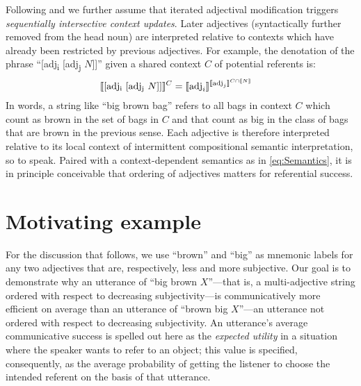 \documentclass[10pt,a4paper]{article}
\newcommand{\den}[1]{\ensuremath{[\![#1]\!]}}
\begin{document}
Following  and  we further assume that iterated adjectival modification triggers \emph{sequentially intersective context updates}. Later adjectives (syntactically further removed from the head noun) are interpreted relative to contexts which have already been restricted by previous adjectives. For example, the denotation of the phrase ``[adj\textsubscript{i} [adj\textsubscript{j} $N$]]'' given a shared context $C$ of potential referents is:
\begin{align}
  \label{eq:SequentialInterpretation}
  \den{\text{[adj\textsubscript{i} [adj\textsubscript{j} $N$]]}}^{C} & = \den{\text{adj}_i}^{\den{\text{adj}_j}^{C\cap \den{N}}} 
\end{align} 
In words, a string like ``big brown bag'' refers to all bags in context $C$ which count as brown in the set of bags in $C$ and that count as big in the class of bags that are brown in the previous sense. Each adjective is therefore interpreted relative to its local context of intermittent compositional semantic interpretation, so to speak. Paired with a context-dependent semantics as in \eqref{eq:Semantics}, it is in principle conceivable that ordering of adjectives matters for referential success.



\section{Motivating example}

For the discussion that follows, we use ``brown'' and ``big'' as mnemonic labels for any two adjectives that are, respectively, less and more subjective. Our goal is to demonstrate why an utterance of ``big brown $X$''---that is, a multi-adjective string ordered with respect to decreasing subjectivity---is communicatively more efficient on average than an utterance of ``brown big $X$''---an utterance not ordered with respect to decreasing subjectivity. An utterance's average communicative success is spelled out here as the \emph{expected utility} in a situation where the speaker wants to refer to an object; this value is specified, consequently, as the average probability of getting the listener to choose the intended referent on the basis of that utterance.
\end{document}
